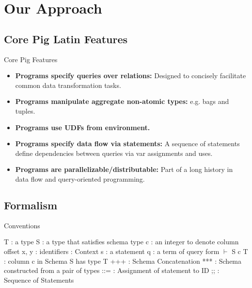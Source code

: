 \section{Our Approach}

\subsection{Core Pig Latin Features}
\begin{frame}{Core Pig Features}
\begin{itemize}
	\item \textbf{Programs specify queries over relations:} Designed to
	concisely facilitate common data transformation tasks.
	\item \textbf{Programs manipulate aggregate non-atomic types:} e.g. bags
	and tuples.
	\item \textbf{Programs use UDFs from environment.}
	\item \textbf{Programs specify data flow via statements:} A sequence of
	statements define dependencies between queries via var assignments and uses.
	\item \textbf{Programs are parallelizable/distributable:} Part of a long
	history in data flow and query-oriented programming.
\end{itemize}
\end{frame}

\subsection{Formalism}
\begin{frame}{Conventions}
\centering
	\begin{flushleft}
		T \quad : a type\newline
		S \quad : a type that satisfies schema type\newline
		c \quad : an integer to denote column offset\newline
		x, y : identifiers\newline
		\textGamma \quad : Context\newline
 		s \quad : a statement\newline
 		q \quad : a term of query form\newline
 		$\vdash$ S c T : column c in Schema S has type T\newline
 		+++ : Schema Concatenation\newline
 		*** : Schema constructed from a pair of types\newline
 		::= : Assignment of statement to ID \newline
 		;; : Sequence of Statements
	\end{flushleft}
\end{frame}

